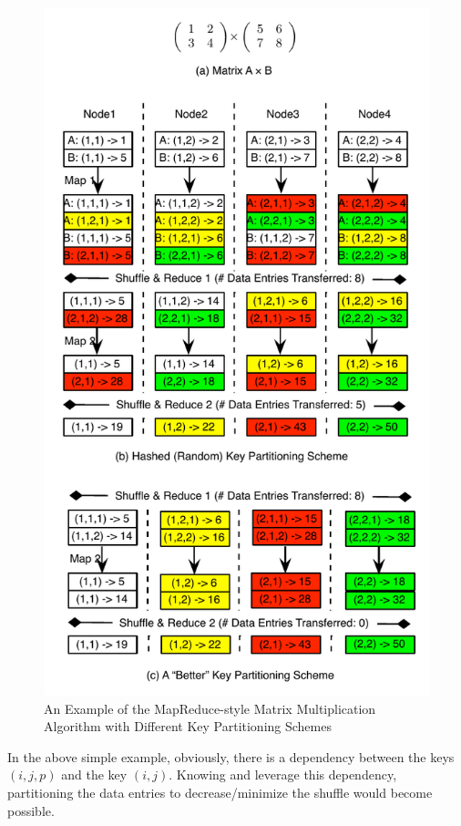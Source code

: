 \documentclass[10pt,journal,compsoc]{IEEEtran}
\begin{document}
\begin{figure}[!t]
\centering
\includegraphics[width=1\columnwidth]{figure1}
\caption{An Example of the MapReduce-style Matrix Multiplication Algorithm with Different Key Partitioning Schemes 
}
\label{fig:matrixExample}
\end{figure}



In the above simple example, obviously, there is a dependency between
the keys $(i,j,p)$ and the key $(i,j)$. Knowing and leverage this
dependency, partitioning the data entries to decrease/minimize the shuffle
would become possible.
\end{document}
